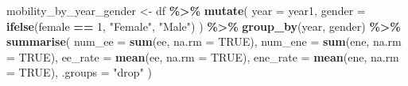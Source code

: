 \documentclass[
]{article}
\newenvironment{Shaded}{\begin{snugshade}}{\end{snugshade}}
\newcommand{\AttributeTok}[1]{\textcolor[rgb]{0.13,0.29,0.53}{#1}}
\newcommand{\ConstantTok}[1]{\textcolor[rgb]{0.56,0.35,0.01}{#1}}
\newcommand{\DecValTok}[1]{\textcolor[rgb]{0.00,0.00,0.81}{#1}}
\newcommand{\FunctionTok}[1]{\textcolor[rgb]{0.13,0.29,0.53}{\textbf{#1}}}
\newcommand{\NormalTok}[1]{#1}
\newcommand{\OtherTok}[1]{\textcolor[rgb]{0.56,0.35,0.01}{#1}}
\newcommand{\SpecialCharTok}[1]{\textcolor[rgb]{0.81,0.36,0.00}{\textbf{#1}}}
\newcommand{\StringTok}[1]{\textcolor[rgb]{0.31,0.60,0.02}{#1}}
\begin{document}
\begin{Shaded}
\begin{Highlighting}[]
\NormalTok{mobility\_by\_year\_gender }\OtherTok{\textless{}{-}}\NormalTok{ df }\SpecialCharTok{\%\textgreater{}\%}
    \FunctionTok{mutate}\NormalTok{(}
        \AttributeTok{year =}\NormalTok{ year1,}
        \AttributeTok{gender =} \FunctionTok{ifelse}\NormalTok{(female }\SpecialCharTok{==} \DecValTok{1}\NormalTok{, }\StringTok{"Female"}\NormalTok{, }\StringTok{"Male"}\NormalTok{)}
\NormalTok{    ) }\SpecialCharTok{\%\textgreater{}\%}
    \FunctionTok{group\_by}\NormalTok{(year, gender) }\SpecialCharTok{\%\textgreater{}\%}
    \FunctionTok{summarise}\NormalTok{(}
        \AttributeTok{num\_ee =} \FunctionTok{sum}\NormalTok{(ee, }\AttributeTok{na.rm =} \ConstantTok{TRUE}\NormalTok{),}
        \AttributeTok{num\_ene =} \FunctionTok{sum}\NormalTok{(ene, }\AttributeTok{na.rm =} \ConstantTok{TRUE}\NormalTok{),}
        \AttributeTok{ee\_rate =} \FunctionTok{mean}\NormalTok{(ee, }\AttributeTok{na.rm =} \ConstantTok{TRUE}\NormalTok{),}
        \AttributeTok{ene\_rate =} \FunctionTok{mean}\NormalTok{(ene, }\AttributeTok{na.rm =} \ConstantTok{TRUE}\NormalTok{),}
        \AttributeTok{.groups =} \StringTok{"drop"}
\NormalTok{    )}


\end{Highlighting}
\end{Shaded}
\end{document}

